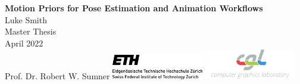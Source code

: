 \documentclass[a4paper,twoside,12pt,chapterprefix=false]{scrbook}
\begin{document}
%


\newcommand{\mfytext}[0]{my fancy text}
\newcommand{\TODO}[1]{\textcolor{red}{TODO: #1}}

\newcommand{\chpref}[1]{Chapter \ref{#1}}
\newcommand{\secref}[1]{Section \ref{#1}}
\newcommand{\figref}[1]{Figure \ref{#1}}
\newcommand{\tabref}[1]{Table \ref{#1}}
\newcommand{\apxref}[1]{Appendix \ref{#1}}

\hypersetup{pageanchor=false} %

%
\begin{titlepage}
	\topmargin 1.0cm
	\oddsidemargin 0.0cm
	\evensidemargin 0.0cm
	\centering
	\Huge
	\vspace{3.0cm}
	\textbf{\textsf{Motion Priors for Pose Estimation and Animation Workflows}} \\[2.0cm]
	\vspace{5.0cm}
	\sffamily
	\Large
	Luke Smith
	\\[0.8cm]
	\large
	Master Thesis
	\\
	April 2022
	\\[1.3cm]
	Prof. Dr. Robert W. Sumner
	\vfill
	\includegraphics*[width=0.3\textwidth]{Figures/ETH_logo} \hfill
	\includegraphics*[width=0.3\textwidth]{Figures/CGL_logo}
	\vspace{3.4cm}
\end{titlepage}
\clearemptydoublepage
\end{document}

